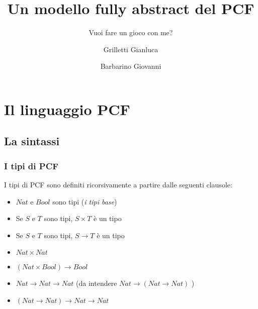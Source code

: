 \documentclass{beamer}
\title{Un modello fully abstract del PCF}
\subtitle{Vuoi fare un gioco con me?}
\author{Grilletti Gianluca \and Barbarino Giovanni}
\institute[Unipi]{Università di Pisa}
\begin{document}
\small


\section{Il linguaggio PCF}
\subsection{La sintassi}

\begin{frame}
	\maketitle
	
\end{frame}


\begin{frame}
	\frametitle{I tipi di PCF}
	
	I tipi di PCF sono definiti ricorsivamente a partire dalle seguenti clausole:
	\begin{itemize}
		\item $Nat$ e $Bool$ sono tipi (\emph{i tipi base})
		\item Se $S$ e $T$ sono tipi, $S\times T$ è un tipo
		\item Se $S$ e $T$ sono tipi, $S\rightarrow T$ è un tipo
	\end{itemize}
	
	\begin{example}
		\begin{itemize}
			\item $Nat\times Nat$
			\item $(Nat\times Bool) \rightarrow Bool$
			\item $Nat\rightarrow Nat\rightarrow Nat$ (da intendere $Nat\rightarrow (Nat\rightarrow Nat)$  )
			\item $(Nat \rightarrow Nat) \rightarrow Nat \rightarrow Nat$
		\end{itemize}

	\end{example}

	
\end{frame}
\end{document}
